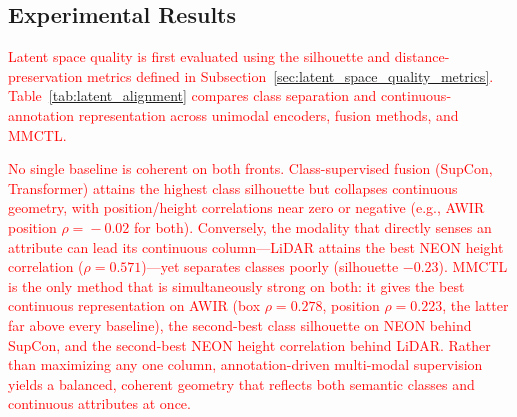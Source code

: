 \documentclass[lettersize,journal]{IEEEtran}
\newcommand{\new}[1]{\textcolor{red}{#1}}
\begin{document}
\subsection{Experimental Results}
\new{Latent space quality is first evaluated using the silhouette and distance-preservation metrics defined in Subsection~\ref{sec:latent_space_quality_metrics}. Table~\ref{tab:latent_alignment} compares class separation and continuous-annotation representation across unimodal encoders, fusion methods, and MMCTL.}

\new{No single baseline is coherent on both fronts. Class-supervised fusion (SupCon, Transformer) attains the highest class silhouette but collapses continuous geometry, with position/height correlations near zero or negative (e.g., AWIR position $\rho\!=\!-0.02$ for both). Conversely, the modality that directly senses an attribute can lead its continuous column---LiDAR attains the best NEON height correlation ($\rho\!=\!0.571$)---yet separates classes poorly (silhouette $-0.23$). MMCTL is the only method that is simultaneously strong on both: it gives the best continuous representation on AWIR (box $\rho\!=\!0.278$, position $\rho\!=\!0.223$, the latter far above every baseline), the second-best class silhouette on NEON behind SupCon, and the second-best NEON height correlation behind LiDAR. Rather than maximizing any one column, annotation-driven multi-modal supervision yields a balanced, coherent geometry that reflects both semantic classes and continuous attributes at once.}


\newcommand{\err}[1]{\,\scriptstyle\pm\,\!#1}
\end{document}
